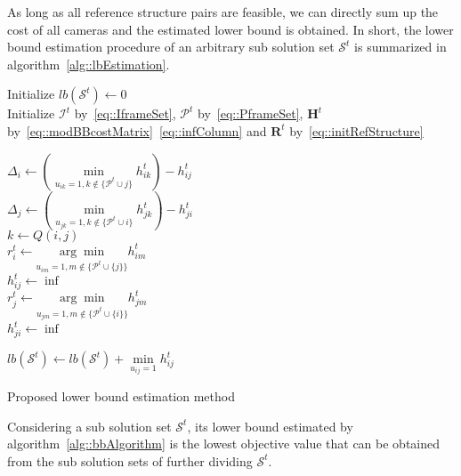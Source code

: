As long as all reference structure pairs are feasible, we can directly sum up the cost of all cameras and the estimated lower bound is obtained.
%
In short, the lower bound estimation procedure of an arbitrary sub solution set $\mathcal{S}^t$ is summarized in algorithm~\ref{alg::lbEstimation}.
%
\IncMargin{1em}
\begin{algorithm}[]
 \SetAlgoLined
 \BlankLine
 Initialize $lb(\mathcal{S}^t) \gets 0$\\
 Initialize $\mathcal{I}^t$ by~\eqref{eq::IframeSet}, $\mathcal{P}^t$ by~\eqref{eq::PframeSet}, $\mathbf{H}^t$ by~\eqref{eq::modBBcostMatrix}~\eqref{eq::infColumn} and $\mathbf{R}^t$ by~\eqref{eq::initRefStructure} \\
 {
 	$\Delta_i \gets \left( \underset{u_{ik}=1, k \notin \{\mathcal{P}^t \cup j\}}{\min} h_{ik}^t \right) - h_{ij}^t$ \\
	$\Delta_j \gets \left( \underset{u_{jk}=1, k \notin \{\mathcal{P}^t \cup i\}}{\min} h_{jk}^t \right) - h_{ji}^t$ \\
 	$k \gets Q(i,j)$ \\
 	{
 		$r_i^t \gets \underset{u_{im}=1, m \notin \{\mathcal{P}^t \cup \{j\}\}}{\arg \min} h_{im}^t$ \\
 		$h_{ij}^t \gets \inf$ \\
 	}
 	{
 		$r_j^t \gets \underset{u_{jm}=1, m \notin \{\mathcal{P}^t \cup \{i\}\}}{\arg \min} h_{jm}^t$ \\
 		$h_{ji}^t \gets \inf$ \\
 	}
 	
 }
 {
 	$lb(\mathcal{S}^t) \gets lb(\mathcal{S}^t) + \underset{u_{ij}=1}{\min} h_{ij}^t$ \\
 }
 \caption{\label{alg::lbEstimation}Proposed lower bound estimation method}
\end{algorithm}
\DecMargin{1em}
%
\begin{mylem}
Considering a sub solution set $\mathcal{S}^t$, its lower bound estimated by algorithm~\ref{alg::bbAlgorithm} is the lowest objective value that can be obtained from the sub solution sets of further dividing $\mathcal{S}^t$.
\label{lemma::lbEstimation}
\end{mylem}
